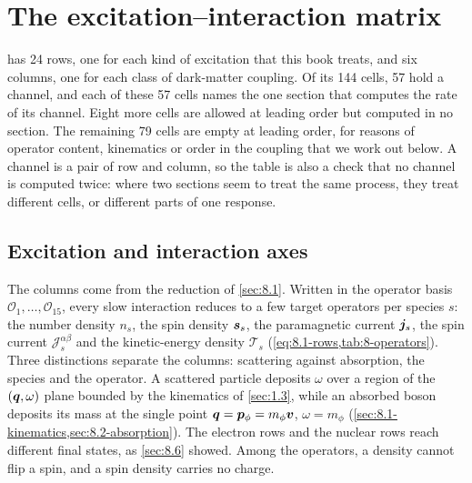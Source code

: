 \section{The excitation--interaction matrix}\label{sec:9.1}

 has 24 rows, one for each kind of excitation that this book treats, and six columns, one for each class of dark-matter coupling. Of its 144 cells, 57 hold a channel, and each of these 57 cells names the one section that computes the rate of its channel. Eight more cells are allowed at leading order but computed in no section. The remaining 79 cells are empty at leading order, for reasons of operator content, kinematics or order in the coupling that we work out below. A channel is a pair of row and column, so the table is also a check that no channel is computed twice: where two sections seem to treat the same process, they treat different cells, or different parts of one response.

\subsection{Excitation and interaction axes}\label{sec:9.1-axes}

The columns come from the reduction of \cref{sec:8.1}. Written in the operator basis $\mathcal{O}_1,\dots,\mathcal{O}_{15}$, every slow interaction reduces to a few target operators per species $s$: the number density $n_s$, the spin density $\bm{s}_s$, the paramagnetic current $\bm{j}_s$, the spin current $\mathcal{J}^{\alpha\beta}_s$ and the kinetic-energy density $\mathcal{T}_s$ (\cref{eq:8.1-rows,tab:8-operators}). Three distinctions separate the columns: scattering against absorption, the species and the operator. A scattered particle deposits $\omega$ over a region of the $(\bm{q},\omega)$ plane bounded by the kinematics of \cref{sec:1.3}, while an absorbed boson deposits its mass at the single point $\bm{q} = \bm{p}_\phi = m_\phi\bm{v}$, $\omega = m_\phi$ (\cref{sec:8.1-kinematics,sec:8.2-absorption}). The electron rows and the nuclear rows reach different final states, as \cref{sec:8.6} showed. Among the operators, a density cannot flip a spin, and a spin density carries no charge.


